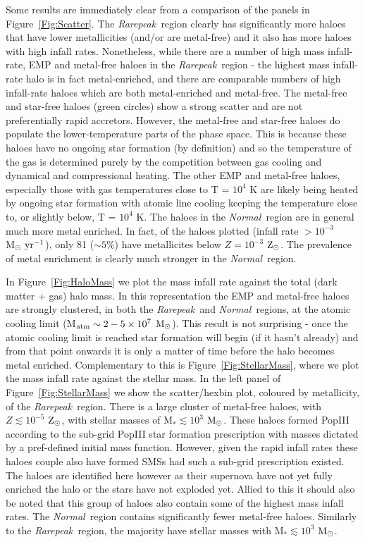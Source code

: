 \documentclass[graphics, twocolumn, usenatbib]{mn2e}
\newcommand{\msolarc} {$\rm{M_{\odot}}$}
\newcommand{\msolaryrc} {$\rm{M_{\odot}~yr^{-1}}$}
\newcommand{\zsolarc} {$\rm{Z_{\odot}}$}
\newcommand{\rarepeak} {\textit{Rarepeak~}}
\newcommand{\normal} {\textit{Normal~}}
\begin{document}
Some results are immediately clear from a comparison of the panels in Figure~\ref{Fig:Scatter}. The \rarepeak region clearly has significantly more haloes that have lower
metallicities (and/or are metal-free) and it also has more haloes
with high infall rates. Nonetheless, while there are a number of high mass infall-rate,
EMP and metal-free haloes in the \rarepeak region - the highest mass infall-rate halo is in fact metal-enriched,
and there are comparable numbers of high infall-rate haloes which are both metal-enriched and metal-free.
The metal-free and star-free haloes (green circles) show a strong scatter and are not preferentially
rapid accretors. However, the metal-free and star-free haloes do populate the lower-temperature parts of the
phase space. This is because these haloes have no ongoing star formation (by definition) and so
the temperature of the gas is determined purely by the competition between gas cooling and
dynamical and compressional heating. The other EMP and metal-free haloes, especially those with gas temperatures
close to T = $10^4$ K are likely being heated by ongoing star formation with atomic line
cooling keeping the temperature close to, or slightly below, T = $10^4$ K. 
The haloes in the \normal region are in general much more metal enriched. In fact, of
the haloes
plotted (infall rate $> 10^{-3}$ \msolaryrc), only 81 ($\sim 5$\%)  have metallicites
below  $Z = 10^{-3}$ \zsolarc. The prevalence of metal enrichment is clearly much stronger in
the \normal region.

In Figure~\ref{Fig:HaloMass} we plot the mass infall rate against the total (dark matter
+ gas) halo mass. In this representation the EMP and metal-free haloes are strongly clustered, in both
the \rarepeak and \normal regions, at the atomic cooling limit (M$_{\rm atm} \sim 2 - 5 \times 10^7$
\msolarc). This result is not surprising - once the atomic cooling limit is reached star formation
will begin (if it hasn't already) and from that point onwards it is only a matter of time before
the halo becomes metal enriched. Complementary to this is Figure~\ref{Fig:StellarMass}, 
where we plot the mass infall rate against the stellar mass. In the left panel of Figure~\ref{Fig:StellarMass} we show the scatter/hexbin plot, coloured by metallicity, of the
\rarepeak region. There is a large cluster of metal-free haloes, with $Z \lesssim 10^{-5}$ \zsolarc,
with stellar masses of M$_{*} \lesssim 10^3$ \msolarc. These haloes formed PopIII
according to the sub-grid PopIII star formation prescription with masses dictated 
by a pref-defined initial mass function. However, given the rapid infall rates these 
haloes couple also have formed SMSs had such a sub-grid prescription existed. The
haloes are identified here however as their supernova have not yet fully enriched the 
halo or the stars have not exploded yet. Allied to this 
it should also be noted that this group of haloes also contain some of the highest mass infall
rates. The \normal region contains significantly fewer metal-free haloes.
Similarly to the \rarepeak region, the majority have stellar masses
with M$_{*} \lesssim 10^3$ \msolarc.  
\end{document}
